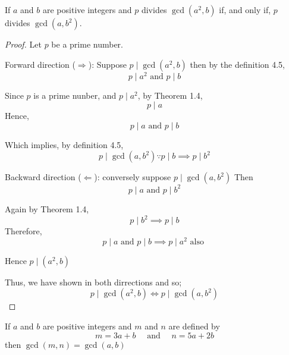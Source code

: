 \documentclass{tufte-handout}
\begin{document}
\begin{question}

\qpart

If \( a \) and \( b \) are positive integers and  \( p \) divides \( \gcd(a^2,b) \) if, and only if,
\( p \) divides \( \gcd(a,b^2) \).


\begin{proof}

Let \( p \) be a prime number.

Forward direction (\( \Rightarrow \)):
Suppose \( p \mid \gcd(a^2,b) \) then by the definition 4.5,
\[ p \mid a^2 \text{ and } p \mid b \]

Since \( p \) is a prime nunber, and \( p \mid a^2 \), by Theorem 1.4,
\[ p \mid a \]
Hence,
\[ p \mid a \text{ and } p \mid b \]

Which implies, by definition 4.5,
\[ p \mid \gcd(a,b^2) \because p \mid b \implies p \mid b^2 \]

Backward direction (\( \Leftarrow \)):
conversely suppose \( p \mid \gcd(a,b^2) \) Then
\[ p \mid a \text{ and } p \mid b^2 \]

Again by Theorem 1.4, 
\[ p \mid b^2 \implies p \mid b \]
Therefore,
\[ p \mid a \text{ and } p \mid b \implies p \mid a^2 \text{ also } \]

Hence \( p \mid(a^2,b) \)

Thus, we have shown in both dirrections and so;
\[ p \mid \gcd(a^2,b) \Longleftrightarrow p \mid \gcd(a,b^2)  \]

\end{proof}

\vspace{5cm}

\qpart

If \( a \) and \( b \) are positive integers and \( m \) and \( n \) are
defined by 
\[ m = 3a + b \quad \text{ and } \quad n = 5a + 2b  \]
then \( \gcd(m,n) = \gcd(a,b) \)


\end{question}
\end{document}
